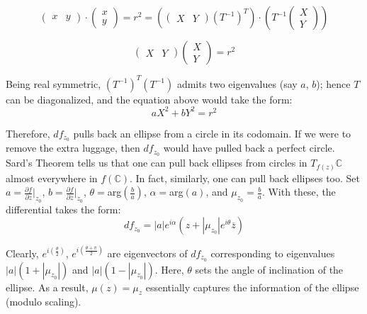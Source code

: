 \documentclass[11pt,a4paper]{article}
\begin{document}
        $$\begin{pmatrix} x&y \end{pmatrix}\cdot \begin{pmatrix} x\\y \end{pmatrix}  = r^2 = \left(\begin{pmatrix} X&Y \end{pmatrix}(T^{-1})^T\right) \cdot \left(T^{-1} \begin{pmatrix} X\\Y \end{pmatrix}\right)$$

        $$\begin{pmatrix} X&Y \end{pmatrix}\begin{pmatrix} X\\Y \end{pmatrix} = r^2$$


        Being real symmetric, $(T^{-1})^T(T^{-1})$ admits two eigenvalues (say $a$, $b$); hence $T$ can be diagonalized, and the equation above would take the form:
        $$aX^2 + bY^2 = r^2$$


        Therefore, $df_{z_0}$ pulls back an ellipse from a circle in its codomain. If we were to remove the extra luggage, then $df_{z_0}$ would have pulled back a perfect circle. Sard's Theorem tells us that one can pull back ellipses from circles in $T_{f(z)}\mathbb{C}$ almost everywhere in $f(\mathbb{C})$. In fact, similarly, one can pull back ellipses too. Set $a = {\frac{\partial f}{\partial z}}\bigg|_{z_0}$, $b = {\frac{\partial f}{\partial \overline{z}}}\bigg|_{z_0}$, $\theta = $arg$(\frac{b}{a})$, $\alpha =$arg$(a)$, and $\mu_{z_0} = \frac{b}{a}$. With these, the differential takes the form:
        $$df_{z_0} = |a|e^{i\alpha}(z+|\mu_{z_0}|e^{i\theta}\overline{z})$$


        Clearly, $e^{i\left(\frac{\theta}{2}\right)}$, $e^{i\left(\frac{\theta + \pi}{2}\right)}$ are eigenvectors of $df_{z_0}$ corresponding to eigenvalues $|a|(1+|\mu_{z_0}|)$ and $|a|(1-|\mu_{z_0}|)$. Here, $\theta$ sets the angle of inclination of the ellipse. As a result, $\mu(z) = \mu_z$ essentially captures the information of the ellipse (modulo scaling).
\end{document}
